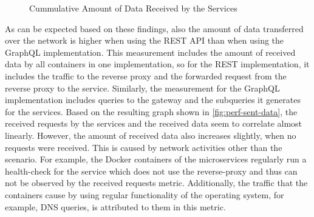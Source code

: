 \begin{figure}[t!]
    \centering
    \caption{Cummulative Amount of Data Received by the Services}\label{fig:perf-sent-data}    
\end{figure}

As can be expected based on these findings, also the amount of data transferred over the network is higher when using the \ac{REST} \ac{API} than when using the GraphQL implementation.
This measurement includes the amount of received data by all containers in one implementation, so for the \ac{REST} implementation, it includes the traffic to the reverse proxy and the forwarded request from the reverse proxy to the service.
Similarly, the measurement for the GraphQL implementation includes queries to the gateway and the subqueries it generates for the services.
Based on the resulting graph shown in \autoref{fig:perf-sent-data}, the received requests by the services and the received data seem to correlate almost linearly.
However, the amount of received data also increases slightly, when no requests were received.
This is caused by network activities other than the scenario.
For example, the Docker containers of the microservices regularly run a health-check for the service which does not use the reverse-proxy and thus can not be observed by the received requests metric.
Additionally, the traffic that the containers cause by using regular functionality of the operating system, for example, \ac{DNS} queries, is attributed to them in this metric.


